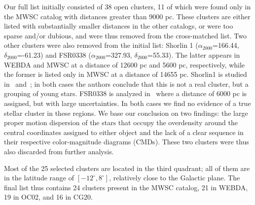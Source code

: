 \documentclass{aa}
\begin{document}
 Our full list initially consisted of 38 open clusters, 11 of
 which were found only in the MWSC catalog with distances greater than 9000 pc.
 These clusters are either listed with substantially smaller distances in the other
 catalogs, or were too sparse and/or dubious, and  were thus removed from
 the cross-matched list.
 Two other clusters were also removed from the initial list: Shorlin 1 
 ($\alpha_{2000}$=166.44, $\delta_{2000}$=-61.23) and FSR0338
 ($\alpha_{2000}$=327.93, $\delta_{2000}$=55.33). The latter appears in WEBDA and
 MWSC at a distance of 12600 pc and 5600 pc, respectively, while the former is
 listed only in MWSC at a distance of 14655 pc. Shorlin1 is studied
 in~\cite{Carraro_2009} and~\cite{Turner_2012}; in both cases the authors
 conclude that this is not a real cluster, but a grouping of young stars.
 FSR0338 is analyzed in~\cite{Froebrich_2010} where a distance of 6000 pc is
 assigned, but with large uncertainties.
 In both cases we find no evidence of a true stellar cluster in these regions.
 We base our conclusion on two findings:  the large proper motion
 dispersion of the stars that occupy the overdensity around the central
 coordinates assigned to either object and the lack of a clear sequence in
 their respective color-magnitude diagrams (CMDs). These two clusters
 were thus also discarded from further analysis.

 Most of the  25 selected clusters are located in the third quadrant;
 all of them are in the latitude range of $\left[-12^{\circ}, 8^{\circ}\right]$,
 relatively close to the Galactic plane. The final list thus contains 24
 clusters present in the MWSC catalog, 21 in WEBDA, 19 in OC02, and 16 in
 CG20.\\
\end{document}
